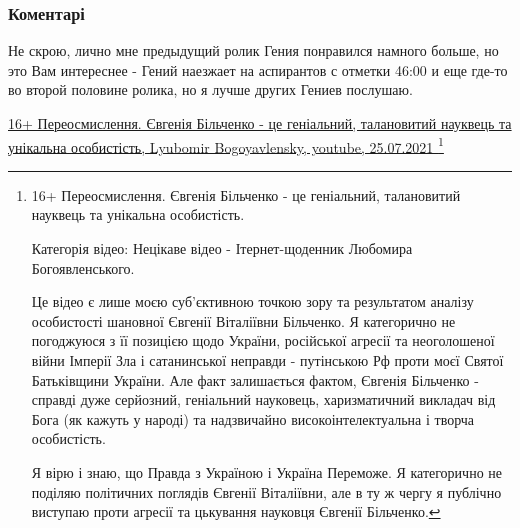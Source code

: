  
 
 
 
 
\subsubsection{Коментарі}
\label{sec:27_07_2021.fb.bilchenko_evgenia.3.npu.cmt}

\begin{itemize}
 
Не скрою, лично мне предыдущий ролик Гения понравился намного больше, но это
Вам интереснее - Гений наезжает на аспирантов с отметки 46:00 и еще где-то во
второй половине ролика, но я лучше других Гениев послушаю.

\href{https://www.youtube.com/watch?v=QLVVoSIO-VE&t=2760s}{%
16+ Переосмислення. Євгенія Більченко - це геніальний, талановитий науквець та унікальна особистість, %
Lyubomir Bogoyavlensky, youtube, 25.07.2021%
}\footnote{
16+ Переосмислення. Євгенія Більченко - це геніальний, талановитий науквець та унікальна особистість.

Категорія відео: Нецікаве відео - Ітернет-щоденник Любомира Богоявленського.

Це відео є лише моєю суб'єктивною точкою зору та результатом аналізу
особистості шановної Євгенії Віталіївни Більченко. Я категорично не погоджуюся
з її позицією щодо України, російської агресії та неоголошеної війни Імперії
Зла і сатанинської неправди - путінською Рф проти моєї Святої Батьківщини
України. Але факт залишається фактом, Євгенія Більченко - справді дуже
серйозний, геніальний науковець, харизматичний викладач від Бога (як кажуть у
народі) та надзвичайно високоінтелектуальна і творча особистість.

Я вірю і знаю, що Правда з Україною і Україна Переможе. Я категорично не
поділяю політичних поглядів Євгенії Віталіївни, але в ту ж чергу я публічно
виступаю проти агресії та цькування науковця Євгенії Більченко. 

}
\end{itemize}
